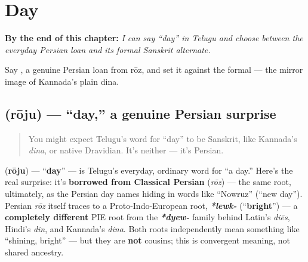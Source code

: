 
\chapter{Day}
\label{ch:te-day}

\begin{chapteropening}
\textbf{By the end of this chapter:} \emph{I can say \textquotedblleft{}day\textquotedblright{} in Telugu and choose between the everyday Persian loan and its formal Sanskrit alternate.}

Say , a genuine Persian loan from rōz, and set it against the formal  — the mirror image of Kannada's plain dina.
\end{chapteropening}

\section[\texorpdfstring{\te{రోజు} (rōju)}{రోజు (rōju)}]{ (rōju) — \textquotedblleft{}day,\textquotedblright{} a genuine Persian surprise}

\label{lesson:TE-C23-roju}



\begin{quote}
You might expect Telugu's word for \textquotedblleft{}day\textquotedblright{} to be Sanskrit, like Kannada's \emph{dina}, or native Dravidian. It's neither — it's Persian.
\end{quote}

\begin{cousinweb}
\textbf{} (\textbf{rōju}) — \textquotedblleft{}\textbf{day}\textquotedblright{} — is Telugu's everyday, ordinary word for \textquotedblleft{}a day.\textquotedblright{} Here's the real surprise: it's \textbf{borrowed from Classical Persian} \textbf{} (\emph{rōz}) — the same root, ultimately, as the Persian day names hiding in words like \textquotedblleft{}Nowruz\textquotedblright{} (\textquotedblleft{}new day\textquotedblright{}). Persian \emph{rōz} itself traces to a Proto-Indo-European root, \emph{\textbf{*lewk-}} (\textquotedblleft{}\textbf{bright}\textquotedblright{}) — a \textbf{completely different} PIE root from the \emph{\textbf{*dyew-}} family behind Latin's \emph{diēs}, Hindi's \emph{din}, and Kannada's \emph{dina}. Both roots independently mean something like \textquotedblleft{}shining, bright\textquotedblright{} — but they are \textbf{not} cousins; this is convergent meaning, not shared ancestry.
\end{cousinweb}

